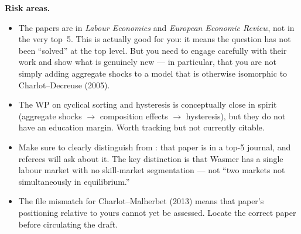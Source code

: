 \documentclass[12pt]{article}
\begin{document}
\medskip

\textbf{Risk areas.}
\begin{itemize}
    \item The \citet{charlot2005} papers are in \emph{Labour Economics} and \emph{European Economic Review}, not in the very top~5. This is actually good for you: it means the question has not been ``solved'' at the top level. But you need to engage carefully with their work and show what is genuinely new --- in particular, that you are not simply adding aggregate shocks to a model that is otherwise isomorphic to Charlot--Decreuse (2005).

    \item The \citet{acabbi2024} WP on cyclical sorting and hysteresis is conceptually close in spirit (aggregate shocks $\to$ composition effects $\to$ hysteresis), but they do not have an education margin. Worth tracking but not currently citable.

    \item Make sure to clearly distinguish from \citet{wasmer2006}: that paper is in a top-5 journal, and referees will ask about it. The key distinction is that Wasmer has a single labour market with no skill-market segmentation --- not ``two markets not simultaneously in equilibrium.''

    \item The file mismatch for Charlot--Malherbet (2013) means that paper's positioning relative to yours cannot yet be assessed. Locate the correct paper before circulating the draft.
\end{itemize}



\end{document}
